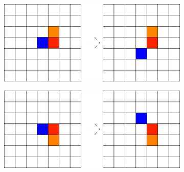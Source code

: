 \begin{figure}[H]\ContinuedFloat
        \begin{subfigure}[T]{0.45\textwidth}
            \centering
            \includegraphics[width=\textwidth]{playground/3.png}
            \label{fig:playground_3}
        \end{subfigure}
        \hfill
        \begin{subfigure}[T]{0.45\textwidth}
            \centering
            \includegraphics[width=\textwidth]{playground/4.png}
            \label{fig:playground_4}
        \end{subfigure}
\end{figure}

